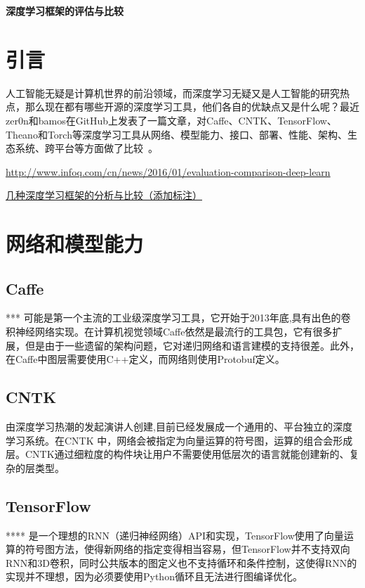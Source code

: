 \documentclass[a4paper,12pt]{ctexart}
\begin{document}
\begin{center}
\huge \textbf{深度学习框架的评估与比较}
\end{center}

\tableofcontents
\newpage

\section*{引言}
人工智能无疑是计算机世界的前沿领域，而深度学习无疑又是人工智能的研究热点，那么现在都有哪些开源的深度学习工具，他们各自的优缺点又是什么呢？最近zer0n和bamos在GitHub上发表了一篇文章，对Caffe、CNTK、TensorFlow、Theano和Torch等深度学习工具从网络、模型能力、接口、部署、性能、架构、生态系统、跨平台等方面做了比较~\cite{深度学习框架的评估与比较_孙镜涛}。

\url{http://www.infoq.com/cn/news/2016/01/evaluation-comparison-deep-learn}%

\href{http://blog.csdn.net/liccv/article/details/52526506}{几种深度学习框架的分析与比较（添加标注）}%


\section{网络和模型能力}
\subsection{Caffe}
***
可能是第一个主流的工业级深度学习工具，它开始于2013年底,具有出色的卷积神经网络实现。在计算机视觉领域Caffe依然是最流行的工具包，它有很多扩展，但是由于一些遗留的架构问题，它对递归网络和语言建模的支持很差。此外，在Caffe中图层需要使用C++定义，而网络则使用Protobuf定义。

\subsection{CNTK}
由深度学习热潮的发起演讲人创建,目前已经发展成一个通用的、平台独立的深度学习系统。在CNTK 中，网络会被指定为向量运算的符号图，运算的组合会形成层。CNTK通过细粒度的构件块让用户不需要使用低层次的语言就能创建新的、复杂的层类型。

\subsection{TensorFlow}
****
是一个理想的RNN（递归神经网络）API和实现，TensorFlow使用了向量运算的符号图方法，使得新网络的指定变得相当容易，但TensorFlow并不支持双向RNN和3D卷积，同时公共版本的图定义也不支持循环和条件控制，这使得RNN的实现并不理想，因为必须要使用Python循环且无法进行图编译优化。
\end{document}
